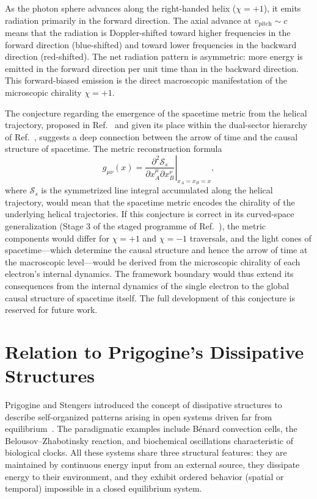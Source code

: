 \documentclass[%
 reprint, amsmath,amssymb, aps, prb, ]{revtex4-2}
\numberwithin{equation}{section}
\begin{document}
As the photon sphere advances along the right-handed helix ($\chi = +1$), it emits radiation primarily in the forward direction. The axial advance at $v_{\mathrm{pitch}} \sim c$ means that the radiation is Doppler-shifted toward higher frequencies in the forward direction (blue-shifted) and toward lower frequencies in the backward direction (red-shifted). The net radiation pattern is asymmetric: more energy is emitted in the forward direction per unit time than in the backward direction. This forward-biased emission is the direct macroscopic manifestation of the microscopic chirality $\chi = +1$.

The conjecture regarding the emergence of the spacetime metric from the helical trajectory, proposed in Ref.~\cite{hanamura51} and given its place within the dual-sector hierarchy of Ref.~\cite{hanamura55}, suggests a deep connection between the arrow of time and the causal structure of spacetime. The metric reconstruction formula
\begin{equation}
g_{\mu\nu}(x) = \left.\frac{\partial^2 \mathcal{S}_s}{\partial x_A^\mu \partial x_B^\nu}\right|_{x_A = x_B = x},
\label{eq:metric_conjecture}
\end{equation}
where $\mathcal{S}_s$ is the symmetrized line integral accumulated along the helical trajectory, would mean that the spacetime metric encodes the chirality of the underlying helical trajectories. If this conjecture is correct in its curved-space generalization (Stage 3 of the staged programme of Ref.~\cite{hanamura55}), the metric components would differ for $\chi = +1$ and $\chi = -1$ traversals, and the light cones of spacetime---which determine the causal structure and hence the arrow of time at the macroscopic level---would be derived from the microscopic chirality of each electron's internal dynamics. The framework boundary would thus extend its consequences from the internal dynamics of the single electron to the global causal structure of spacetime itself. The full development of this conjecture is reserved for future work.


\section{Relation to Prigogine's Dissipative Structures}
\label{sec:prigogine}

Prigogine and Stengers introduced the concept of dissipative structures to describe self-organized patterns arising in open systems driven far from equilibrium~\cite{Prigogine1984}. The paradigmatic examples include B\'enard convection cells, the Belousov--Zhabotinsky reaction, and biochemical oscillations characteristic of biological clocks. All these systems share three structural features: they are maintained by continuous energy input from an external source, they dissipate energy to their environment, and they exhibit ordered behavior (spatial or temporal) impossible in a closed equilibrium system.
\end{document}
